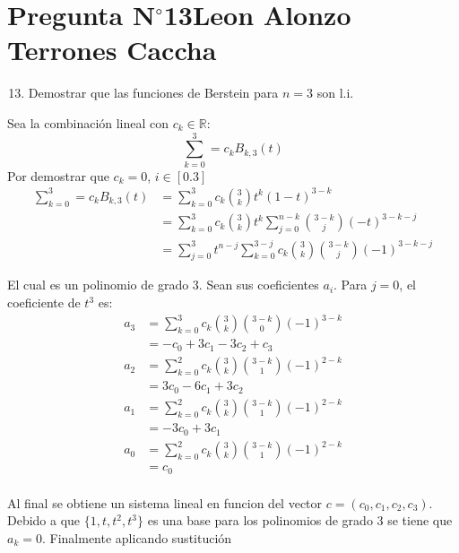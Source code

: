 \section{Pregunta N$^{\circ}$13\qquad Leon Alonzo Terrones Caccha}

\begin{frame}
    \begin{enumerate}\setcounter{enumi}{12}
        \item
            Demostrar que las funciones de Berstein para $n=3$ son l.i.
             
    \end{enumerate}

    \begin{solution}

    Sea la combinación lineal con $c_k\in\mathbb{R}:$
    \[\sum_{k=0}^{3}=c_{k}B_{k,3}(t)\]
    Por demostrar que $c_k=0$, $i\in[0.3]$
    \begin{align*}
        \sum_{k=0}^{3}=c_{k}B_{k,3}(t)&=\sum_{k=0}^{3}c_k\binom{3}{k}t^k(1-t)^{3-k}\\
        &=\sum_{k=0}^{3}{c_k\binom{3}{k}t^k\sum_{j=0}^{n-k}\binom{3-k}{j}{(-t)^{3-k-j}}}\\
        &=\sum_{j=0}^{3}{t^{n-j}\sum_{k=0}^{3-j}{c_k\binom{3}{k}\binom{3-k}{j}(-1)^{3-k-j}}}
    \end{align*}

    El cual es un polinomio de grado 3. Sean sus coeficientes $a_i$.
Para $j=0$, el coeficiente de $t^3$ es:
\begin{align*}
    a_{3}&=\sum_{k=0}^{3}{c_k\binom{3}{k}\binom{3-k}{0}(-1)^{3-k}}\\
    &=-c_0+3c_1-3c_2+c_3\\
    a_{2}&=\sum_{k=0}^{2}{c_k\binom{3}{k}\binom{3-k}{1}(-1)^{2-k}}\\
    &=3c_0-6c_1+3c_2\\
    a_{1}&=\sum_{k=0}^{2}{c_k\binom{3}{k}\binom{3-k}{1}(-1)^{2-k}}\\
    &=-3c_0+3c_1\\
    a_{0}&=\sum_{k=0}^{2}{c_k\binom{3}{k}\binom{3-k}{1}(-1)^{2-k}}\\
    &=c_0\\
\end{align*}


Al final se obtiene un sistema lineal en funcion del vector $c=(c_0,c_1,c_2,c_3)$. Debido a que $\{1,t,t^2,t^3\}$ es una base para los polinomios de grado 3 se tiene que $a_k=0$. Finalmente aplicando sustitución





    
    \begin{comment}
        \[
\begin{array}{cccccc}
x_0=0 & y_0=0 \\
    &     & 1 \\
x_1=1 & y_1=1 &             & \frac{\sqrt{3}-3}{6}\\
    &     & \frac{\sqrt{3}-1}{2}\\
x_2=3 & y_2=\sqrt{3}
\end{array}
\]
    \end{comment}

        
    \end{solution}
\end{frame}